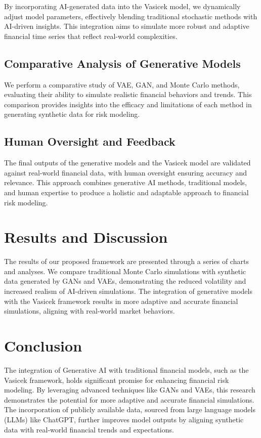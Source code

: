 \documentclass[a4paper,headinclude=on,footinclude=on,12pt,oneside]{scrbook}
\begin{document}
By incorporating AI-generated data into the Vasicek model, we dynamically adjust model parameters, effectively blending traditional stochastic methods with AI-driven insights. This integration aims to simulate more robust and adaptive financial time series that reflect real-world complexities.

\subsection{Comparative Analysis of Generative Models}

We perform a comparative study of VAE, GAN, and Monte Carlo methods, evaluating their ability to simulate realistic financial behaviors and trends. This comparison provides insights into the efficacy and limitations of each method in generating synthetic data for risk modeling.

\subsection{Human Oversight and Feedback}

The final outputs of the generative models and the Vasicek model are validated against real-world financial data, with human oversight ensuring accuracy and relevance. This approach combines generative AI methods, traditional models, and human expertise to produce a holistic and adaptable approach to financial risk modeling.

\section{Results and Discussion}

The results of our proposed framework are presented through a series of charts and analyses. We compare traditional Monte Carlo simulations with synthetic data generated by GANs and VAEs, demonstrating the reduced volatility and increased realism of AI-driven simulations. The integration of generative models with the Vasicek framework results in more adaptive and accurate financial simulations, aligning with real-world market behaviors.

\section{Conclusion}

The integration of Generative AI with traditional financial models, such as the Vasicek framework, holds significant promise for enhancing financial risk modeling. By leveraging advanced techniques like GANs and VAEs, this research demonstrates the potential for more adaptive and accurate financial simulations. The incorporation of publicly available data, sourced from large language models (LLMs) like ChatGPT, further improves model outputs by aligning synthetic data with real-world financial trends and expectations.
\end{document}

